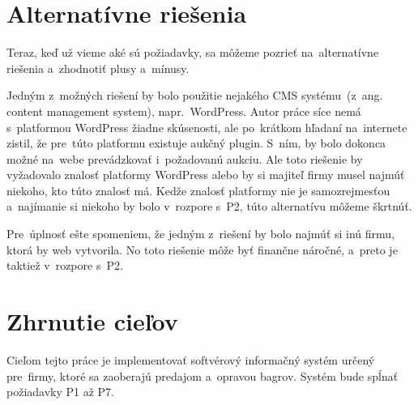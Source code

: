 \section{Alternatívne riešenia}
\label{alternativne riesenia}

Teraz, keď už vieme aké sú požiadavky, sa môžeme pozrieť na~alternatívne riešenia a~zhodnotiť plusy a~mínusy.

Jedným z~možných riešení by bolo použitie nejakého CMS systému~(z~ang. content management system), napr.~WordPress. Autor práce síce nemá s~platformou WordPress žiadne skúsenosti, ale po~krátkom hľadaní na~internete zistil, že pre~túto platformu existuje aukčný plugin. S~ním, by bolo dokonca možné na~webe prevádzkovať i~požadovanú aukciu. Ale toto riešenie by vyžadovalo znalosť platformy WordPress alebo by si majiteľ firmy musel najmúť niekoho, kto túto znalosť má. Kedže znalosť platformy nie je samozrejmesťou a~najímanie si niekoho by bolo v~rozpore s~P2, túto alternatívu môžeme škrtnúť.

Pre~úplnosť ešte spomeniem, že jedným z~riešení by bolo najmúť si inú firmu, ktorá by web vytvorila. No toto riešenie môže byť finančne náročné, a~preto je taktiež v~rozpore s~P2.

\section{Zhrnutie cieľov}

Cieľom tejto práce je implementovať softvérový informačný systém určený pre~firmy, ktoré sa zaoberajú predajom a~opravou bagrov. Systém bude spĺnať požiadavky P1 až P7.
